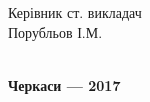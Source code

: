 \documentclass[../main.tex]{subfiles}
\begin{document}
\begin{titlepage}
{\begin{flushright}
\begin{minipage}[t]{7cm}
				\end{minipage}
			\end{flushright}
			\hfill
			\begin{flushright}
				\begin{minipage}[t]{6.8cm}
					\begin{flushright}
						Керівник ст. викладач \\
						Порубльов І.М. \\
						\hrulefill \\
					\end{flushright}
				\end{minipage}
			\end{flushright}
		}
		\vfill
		\vfill
		{\centering\bfseries Черкаси — 2017 \\ }
	\end{titlepage}
	
\end{document}
